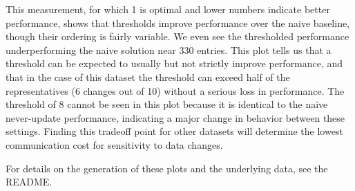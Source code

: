 This measurement, for which 1 is optimal and lower numbers indicate better performance, shows that thresholds improve performance over the naive baseline, though their ordering is fairly variable. We even see the thresholded performance underperforming the naive solution near 330 entries. This plot tells us that a threshold can be expected to usually but not strictly improve performance, and that in the case of this dataset the threshold can exceed half of the representatives (6 changes out of 10) without a serious loss in performance. The threshold of 8 cannot be seen in this plot because it is identical to the naive never-update performance, indicating a major change in behavior between these settings. Finding this tradeoff point for other datasets will determine the lowest communication cost for sensitivity to data changes.

For details on the generation of these plots and the underlying data, see the README.
